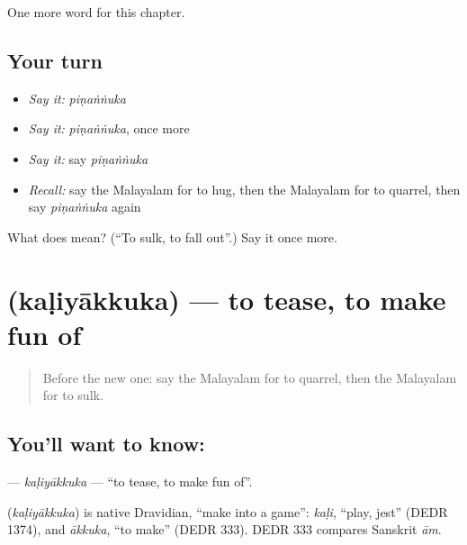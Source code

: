 \begin{grammarlens}[title={What you've built}]
One more word for this chapter.
\end{grammarlens}

\subsection*{Your turn}
\begin{itemize}
\raggedright
  \item \emph{Say it:} \emph{piṇaṅṅuka}
  \item \emph{Say it:} \emph{piṇaṅṅuka}, once more
  \item \emph{Say it:} say \emph{piṇaṅṅuka}
  \item \emph{Recall:} say the Malayalam for to hug, then the Malayalam for to quarrel, then say \emph{piṇaṅṅuka} again
\end{itemize}

\begin{tcolorbox}[breakable,colback=teal!4,colframe=teal!35!black,title={Before you move on}]
What does  mean? (\textquotedblleft{}To sulk, to fall out\textquotedblright{}.) Say it once more.
\end{tcolorbox}
\section[\texorpdfstring{\ml{കളിയാക്കുക} (kaḷiyākkuka)}{കളിയാക്കുക (kaḷiyākkuka)}]{ (kaḷiyākkuka) — to tease, to make fun of}

\label{lesson:ML-C186-kaliyakkuka}



\begin{quote}
Before the new one: say the Malayalam for to quarrel, then the Malayalam for to sulk.
\end{quote}

\subsection*{You'll want to know: }
\textbf{} — \emph{kaḷiyākkuka} — \textquotedblleft{}to tease, to make fun of\textquotedblright{}.

\begin{cousinweb}
\textbf{} (\emph{kaḷiyākkuka}) is native Dravidian, \textquotedblleft{}make into a game\textquotedblright{}: \emph{kaḷi}, \textquotedblleft{}play, jest\textquotedblright{} (DEDR 1374), and \emph{ākkuka}, \textquotedblleft{}to make\textquotedblright{} (DEDR 333). DEDR 333 compares Sanskrit \emph{ām}.
\end{cousinweb}

